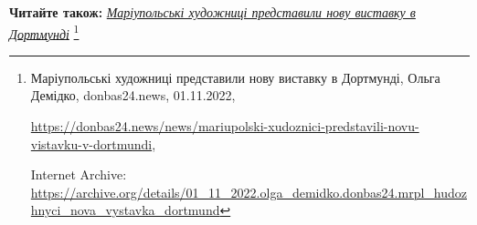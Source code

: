  
 
 
 
 

\textbf{Читайте також:} \href{https://archive.org/details/01_11_2022.olga_demidko.donbas24.mrpl_hudozhnyci_nova_vystavka_dortmund}{\emph{Маріупольські художниці представили нову виставку в Дортмунді}}%
\footnote{Маріупольські художниці представили нову виставку в Дортмунді, Ольга Демідко, donbas24.news, 01.11.2022, \par%
\url{https://donbas24.news/news/mariupolski-xudoznici-predstavili-novu-vistavku-v-dortmundi}, \par%
Internet Archive: \url{https://archive.org/details/01_11_2022.olga_demidko.donbas24.mrpl_hudozhnyci_nova_vystavka_dortmund}%
}
